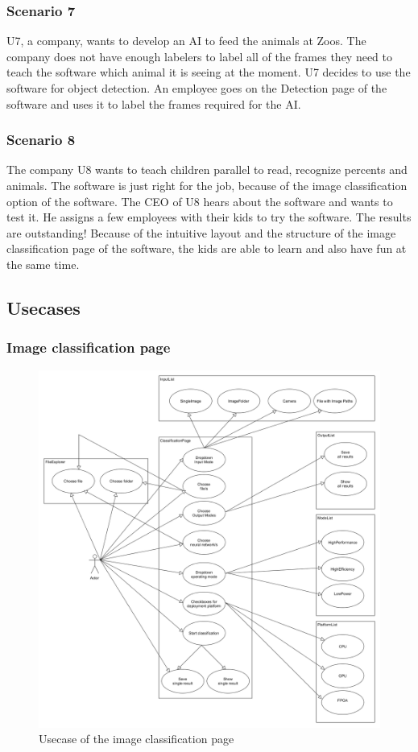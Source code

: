 \documentclass[parskip=full]{scrartcl}
\begin{document}
\subsubsection{Scenario 7}
U7, a company, wants to develop an AI to feed the animals at Zoos. The company does not have enough labelers to label all of the frames they need to teach the software which animal it is seeing at the moment. U7 decides to use the software for object detection. An employee goes on the Detection page of the software and uses it to label the frames required for the AI.
\subsubsection{Scenario 8}
The company U8 wants to teach children parallel to read, recognize percents and animals. The software is just right for the job, because of the \gls{image classification} option of the software. The CEO of U8 hears about the software and wants to test it. He assigns a few employees with their kids to try the software. The results are outstanding! Because of the intuitive layout and the structure of the \gls{image classification} page of the software, the kids are able to learn and also have fun at the same time.
\clearpage
\subsection{Usecases}
\subsubsection{Image classification page}
\begin{figure}[htb!]
\centering
\includegraphics[width=\textwidth]{ClassificationUsecase}
\caption{Usecase of the \gls{image classification} page}
\end{figure}
\newpage
\end{document}
